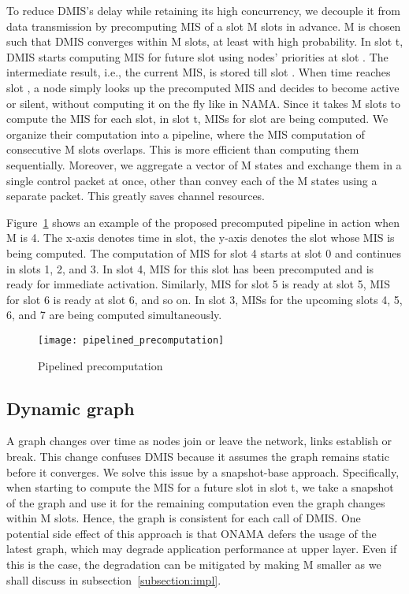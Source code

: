 \documentclass[conference]{IEEEtran}
\newcommand{\figWidth}{0.9\linewidth}	\newcommand{\figWidthM}{.99\linewidth}
\begin{document}
To reduce DMIS's delay while retaining its high concurrency, we decouple it from data transmission by precomputing MIS of a slot M slots in advance. 
M is chosen such that DMIS converges within M slots, at least with high probability. In slot t, DMIS starts computing MIS for future slot  using nodes' priorities at slot . The intermediate result, i.e., the current MIS, is stored till slot . When time reaches slot , a node simply looks up the precomputed MIS and decides to become active or silent, without computing it on the fly like in NAMA.
Since it takes M slots to compute the MIS for each slot, in slot t, MISs for slot  are being computed. We organize their computation into a pipeline, where the MIS computation of consecutive M slots overlaps. This is more efficient than computing them sequentially. Moreover, we aggregate a vector of M states and exchange them in a single control packet at once, other than convey each of the M states using a separate packet. This greatly saves channel resources.

Figure~\ref{fig:pipelined_precomputation} shows an example of the proposed precomputed pipeline in action when M is 4. The x-axis denotes time in slot, the y-axis denotes the slot whose MIS is being computed. The computation of MIS for slot 4 starts at slot 0 and continues in slots 1, 2, and 3. In slot 4, MIS for this slot has been precomputed and is ready for immediate activation. Similarly, MIS for slot 5 is ready at slot 5, MIS for slot 6 is ready at slot 6, and so on. In slot 3, MISs for the upcoming slots 4, 5, 6, and 7 are being computed simultaneously.

\begin{figure}[!tbhp]
\centering
\texttt{[image: pipelined\_precomputation]}
\caption{Pipelined precomputation}
\label{fig:pipelined_precomputation}
\end{figure}

\subsection{Dynamic graph}
A graph changes over time as nodes join or leave the network, links establish or break. This change confuses DMIS because it assumes the graph remains static before it converges. We solve this issue by a snapshot-base approach. Specifically, when starting to compute the MIS for a future slot  in slot t, we take a snapshot of the graph and use it for the remaining computation even the graph changes within M slots. Hence, the graph is consistent for each call of DMIS. One potential side effect of this approach is that ONAMA defers the usage of the latest graph, which may degrade application performance at upper layer. 
Even if this is the case, the degradation can be mitigated by making M smaller as we shall discuss in subsection~\ref{subsection:impl}.	
\end{document}
